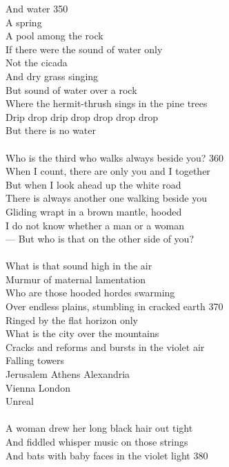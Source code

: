 \documentclass{article}
\begin{document}
And water                                                        \hfill 350 \\
A spring \\
A pool among the rock \\
If there were the sound of water only \\
Not the cicada \\
And dry grass singing \\
But sound of water over a rock \\
Where the hermit-thrush sings in the pine trees \\
Drip drop drip drop drop drop drop \\
But there is no water \\
 \\
Who is the third who walks always beside you?                   \hfill 360 \\
When I count, there are only you and I together \\
But when I look ahead up the white road \\
There is always another one walking beside you \\
Gliding wrapt in a brown mantle, hooded \\
I do not know whether a man or a woman \\
--- But who is that on the other side of you? \\
 \\
What is that sound high in the air \\
Murmur of maternal lamentation \\
Who are those hooded hordes swarming \\
Over endless plains, stumbling in cracked earth                  \hfill 370 \\
Ringed by the flat horizon only \\
What is the city over the mountains \\
Cracks and reforms and bursts in the violet air \\
Falling towers \\
Jerusalem Athens Alexandria \\
Vienna London \\
Unreal \\
 \\
A woman drew her long black hair out tight \\
And fiddled whisper music on those strings \\
And bats with baby faces in the violet light                     \hfill 380 \\
\end{document}
